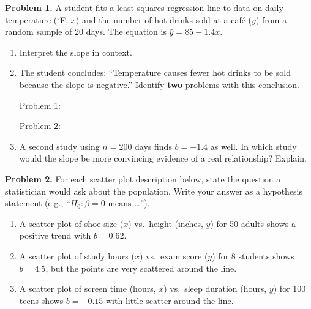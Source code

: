 \documentclass[10pt]{article}
\begin{document}
\namedateperiod

\vspace{0.1in}

\textbf{Problem 1.} A student fits a least-squares regression line to data on daily
temperature ($^\circ$F, $x$) and the number of hot drinks sold at a caf\'e ($y$) from a
random sample of 20 days. The equation is $\hat{y} = 85 - 1.4x$.

\begin{enumerate}[label=\alph*.]

  \item Interpret the slope in context.


  \item The student concludes: ``Temperature causes fewer hot drinks to be sold because
        the slope is negative.'' Identify \textbf{two} problems with this conclusion.

        Problem 1: 

        Problem 2: 

  \item A second study using $n = 200$ days finds $b = -1.4$ as well. In which study
        would the slope be more convincing evidence of a real relationship? Explain.


\end{enumerate}

\vspace{0.15in}

\textbf{Problem 2.} For each scatter plot description below, state the question a
statistician would ask about the population. Write your answer as a hypothesis
statement (e.g., ``$H_0\colon \beta = 0$ means \ldots'').

\begin{enumerate}[label=\alph*.]

  \item A scatter plot of shoe size ($x$) vs.\ height (inches, $y$) for 50 adults shows
        a positive trend with $b = 0.62$.


  \item A scatter plot of study hours ($x$) vs.\ exam score ($y$) for 8 students shows
        $b = 4.5$, but the points are very scattered around the line.


  \item A scatter plot of screen time (hours, $x$) vs.\ sleep duration (hours, $y$) for
        100 teens shows $b = -0.15$ with little scatter around the line.


\end{enumerate}
\end{document}
